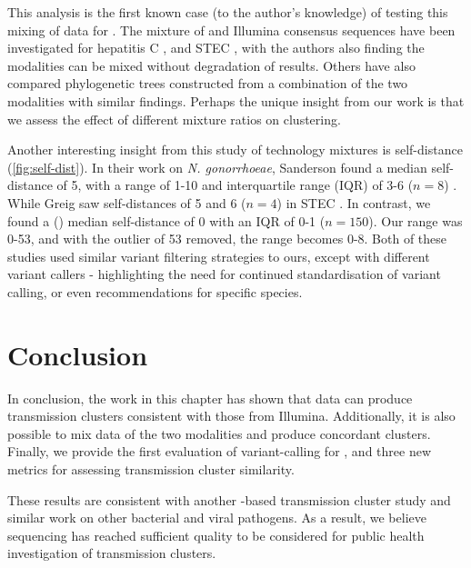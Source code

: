 This analysis is the first known case (to the author's knowledge) of testing this mixing of data for \mtb{}. The mixture of \ont{} and Illumina consensus sequences have been investigated for hepatitis C \cite{riaz2021}, and STEC \cite{greig2021}, with the authors also finding the modalities can be mixed without degradation of results. Others have also compared phylogenetic trees constructed from a combination of the two modalities \cite{lijun2020,McNaughton2019,greig2021} with similar findings. Perhaps the unique insight from our work is that we assess the effect of different mixture ratios on clustering. 

Another interesting insight from this study of technology mixtures is self-distance (\autoref{fig:self-dist}). In their work on \textit{N. gonorrhoeae}, Sanderson \etal{} found a median self-distance of 5, with a range of 1-10 and interquartile range (IQR) of 3-6 ($n=8$) \cite{sanderson2020}. While Greig \etal{} saw self-distances of 5 and 6 ($n=4$) in STEC \cite{greig2021}. In contrast, we found a (\bcftools{}) median self-distance of 0 with an IQR of 0-1 ($n=150$). Our range was 0-53, and with the outlier of 53 removed, the range becomes 0-8. Both of these studies used similar variant filtering strategies to ours, except with different variant callers - highlighting the need for continued standardisation of \ont{} variant calling, or even recommendations for specific species.


\section{Conclusion}

In conclusion, the work in this chapter has shown that \ont{} data can produce transmission clusters consistent with those from Illumina. Additionally, it is also possible to mix data of the two modalities and produce concordant clusters. Finally, we provide the first evaluation of \ont{} variant-calling for \mtb{}, and three new metrics for assessing transmission cluster similarity.

These results are consistent with another \mtb{} \ont{}-based transmission cluster study and similar work on other bacterial and viral pathogens. As a result, we believe \ont{} sequencing has reached sufficient quality to be considered for public health investigation of transmission clusters.


